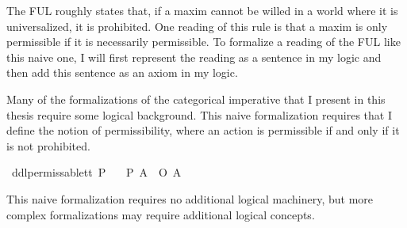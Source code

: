 \begin{isabellebody}
\begin{isamarkuptext}
The FUL roughly states that, if a maxim cannot be willed in a world where it is universalized, it is prohibited. One
reading of this rule is that a maxim is only permissible if it is necessarily permissible. To formalize
a reading of the FUL like this naive one, I will first represent the reading as a sentence in my logic
and then add this sentence as an axiom in my logic.%
\end{isamarkuptext}\isamarkuptrue%
%
\isadelimdocument
%
\endisadelimdocument
%
\isatagdocument
%
\isamarkuptrue%
%
\endisatagdocument
{\isafolddocument}%
%
\isadelimdocument
%
\endisadelimdocument
%
\begin{isamarkuptext}%
Many of the formalizations of the categorical imperative that I present in this thesis require
some logical background. This naive formalization requires that I define the notion of permissibility,
where an action is permissible if and only if it is not prohibited.%
\end{isamarkuptext}\isamarkuptrue%
\isamarkupfalse%
\ ddlpermissable{\isacharcolon}{\isacharcolon}{\isachardoublequoteopen}t{\isasymRightarrow}t{\isachardoublequoteclose}\ {\isacharparenleft}{\isachardoublequoteopen}P{\isacharunderscore}{\isachardoublequoteclose}{\isacharparenright}\isanewline
\ \ \ {\isachardoublequoteopen}{\isacharparenleft}P\ A{\isacharparenright}\ {\isasymequiv}\ {\isacharparenleft}\isactrlbold {\isasymnot}{\isacharparenleft}O\ {\isacharbraceleft}\isactrlbold {\isasymnot}A{\isacharbraceright}{\isacharparenright}{\isacharparenright}{\isachardoublequoteclose}\isanewline
%
%
\begin{isamarkuptext}%
This naive formalization requires no additional logical machinery, but more complex
formalizations may require additional logical concepts. 


\end{isamarkuptext}
\end{isabellebody}
